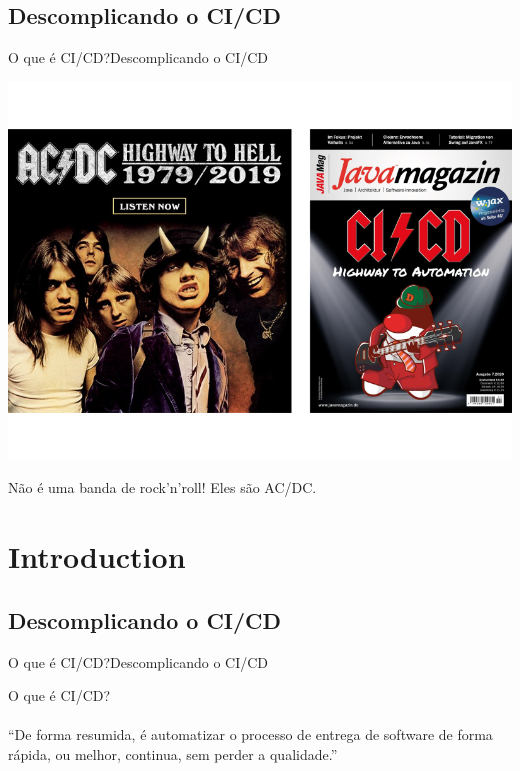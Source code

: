 \documentclass[10pt]{beamer}
\begin{document}
\subsection{Descomplicando o CI/CD}
\begin{frame}{O que é CI/CD?}{Descomplicando o CI/CD}
  \begin{center}
    \includegraphics[scale=0.38]{images/acdc.png}
  \end{center}
   \begin{center}
      Não é uma banda de rock'n'roll! Eles são AC/DC.
   \end{center}
\end{frame}

\section{Introduction}
\subsection{Descomplicando o CI/CD}
\begin{frame}{O que é CI/CD?}{Descomplicando o CI/CD}
    \begin{center}
      O que é CI/CD? \\~\\ ``De forma resumida, é automatizar o processo de entrega de software de forma rápida, ou melhor, continua, sem perder a qualidade.''
    \end{center}
\end{frame}
\end{document}
